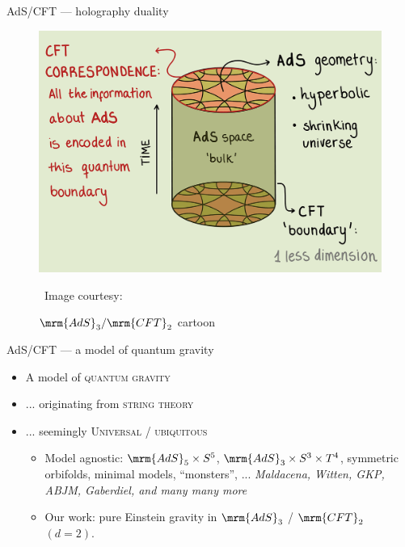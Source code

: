 \documentclass[
	10pt
	,noamsthm
]{beamer}
\begin{document}
\begin{frame}{AdS/CFT --- holography duality}{%
	\citeMaldacena%
}
\vspace{-2.5\baselineskip}
\stateAdsCft
\vspace{-1.8\baselineskip}
\begin{figure}[!h]
	\centering
	\includegraphics[width=.5\linewidth]{img/ads-cft.png}

	\vspace{-.3\baselineskip}
	\caption{$\mrm{AdS}_3/\mrm{CFT}_2$ cartoon}
	
	\vspace*{-.8\baselineskip}
	\scriptsize\ Image courtesy: \textcite{AldegundePWSep22}
\end{figure}
\vspace{-1.3\baselineskip}
\end{frame}


\begin{frame}{AdS/CFT --- a model of quantum gravity}{%
	\citeMaldacena
}
\vspace{-2.4\baselineskip}
\stateAdsCft
\vspace{-1.6\baselineskip}
\pause
\begin{itemize}

\item A model of \textsc{quantum gravity}
\item ... originating from \textsc{string theory}
\item ... seemingly \textsc{Universal / ubiquitous}

\pause
\begin{itemize}
	\item Model agnostic: $\mrm{AdS}_5\times S^5$, $\mrm{AdS}_3\times S^3 \times T^4$, symmetric orbifolds, minimal models, ``monsters'', ... \textit{\small Maldacena, Witten, GKP, ABJM, Gaberdiel, and many many more}
	\item Our work: pure Einstein gravity in $\mrm{AdS}_3$ / $\mrm{CFT}_2$ $(d=2)$.
	
\end{itemize}
\end{itemize}
\end{frame}
\end{document}
